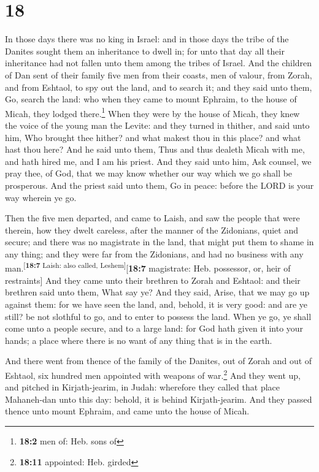 \hypertarget{section-17}{%
\section{18}\label{section-17}}

 In those days there was no king in Israel: and in those
days the tribe of the Danites sought them an inheritance to dwell in;
for unto that day all their inheritance had not fallen unto them among
the tribes of Israel.  And the children of Dan sent of
their family five men from their coasts, men of valour, from Zorah, and
from Eshtaol, to spy out the land, and to search it; and they said unto
them, Go, search the land: who when they came to mount Ephraim, to the
house of Micah, they lodged there.\footnote{\textbf{18:2} men of: Heb.
  sons of}  When they were by the house of Micah, they
knew the voice of the young man the Levite: and they turned in thither,
and said unto him, Who brought thee hither? and what makest thou in this
place? and what hast thou here?  And he said unto them,
Thus and thus dealeth Micah with me, and hath hired me, and I am his
priest.  And they said unto him, Ask counsel, we pray
thee, of God, that we may know whether our way which we go shall be
prosperous.  And the priest said unto them, Go in peace:
before the LORD is your way wherein ye go.

 Then the five men departed, and came to Laish, and saw
the people that were therein, how they dwelt careless, after the manner
of the Zidonians, quiet and secure; and there was no magistrate in the
land, that might put them to shame in any thing; and they were far from
the Zidonians, and had no business with any
man.\textsuperscript{{[}\textbf{18:7} Laish: also called,
Leshem{]}}{[}\textbf{18:7} magistrate: Heb. possessor, or, heir of
restraints{]}  And they came unto their brethren to Zorah
and Eshtaol: and their brethren said unto them, What say ye?
 And they said, Arise, that we may go up against them: for
we have seen the land, and, behold, it is very good: and are ye still?
be not slothful to go, and to enter to possess the land. 
When ye go, ye shall come unto a people secure, and to a large land: for
God hath given it into your hands; a place where there is no want of any
thing that is in the earth.

 And there went from thence of the family of the Danites,
out of Zorah and out of Eshtaol, six hundred men appointed with weapons
of war.\footnote{\textbf{18:11} appointed: Heb. girded} 
And they went up, and pitched in Kirjath-jearim, in Judah: wherefore
they called that place Mahaneh-dan unto this day: behold, it is behind
Kirjath-jearim.  And they passed thence unto mount
Ephraim, and came unto the house of Micah.

